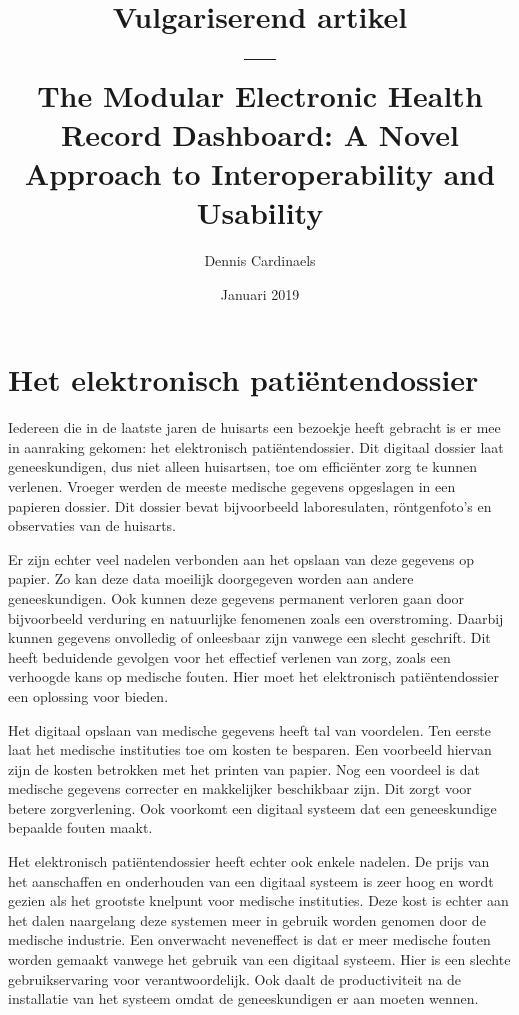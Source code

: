 \documentclass{article}
\title{Vulgariserend artikel\\---\\The Modular Electronic Health Record Dashboard: A Novel Approach to Interoperability and Usability}
\date{Januari 2019}
\author{Dennis Cardinaels}
\begin{document}
\maketitle

\section{Het elektronisch pati\"{e}ntendossier} 

Iedereen die in de laatste jaren de huisarts een bezoekje heeft gebracht is er mee in aanraking gekomen: het elektronisch pati\"{e}ntendossier. Dit digitaal dossier laat geneeskundigen, dus niet alleen huisartsen, toe om effici\"{e}nter zorg te kunnen verlenen. Vroeger werden de meeste medische gegevens opgeslagen in een papieren dossier. Dit dossier bevat bijvoorbeeld laboresulaten, r\"{o}ntgenfoto's en observaties van de huisarts.

Er zijn echter veel nadelen verbonden aan het opslaan van deze gegevens op papier. Zo kan deze data moeilijk doorgegeven worden aan andere geneeskundigen. Ook kunnen deze gegevens permanent verloren gaan door bijvoorbeeld verduring en natuurlijke fenomenen zoals een overstroming. Daarbij kunnen gegevens onvolledig of onleesbaar zijn vanwege een slecht geschrift. Dit heeft beduidende gevolgen voor het effectief verlenen van zorg, zoals een verhoogde kans op medische fouten. Hier moet het elektronisch pati\"{e}ntendossier een oplossing voor bieden.

Het digitaal opslaan van medische gegevens heeft tal van voordelen. Ten eerste laat het medische instituties toe om kosten te besparen. Een voorbeeld hiervan zijn de kosten betrokken met het printen van papier. Nog een voordeel is dat medische gegevens correcter en makkelijker beschikbaar zijn. Dit zorgt voor betere zorgverlening. Ook voorkomt een digitaal systeem dat een geneeskundige bepaalde fouten maakt.

Het elektronisch pati\"{e}ntendossier heeft echter ook enkele nadelen. De prijs van het aanschaffen en onderhouden van een digitaal systeem is zeer hoog en wordt gezien als het grootste knelpunt voor medische instituties. Deze kost is echter aan het dalen naargelang deze systemen meer in gebruik worden genomen door de medische industrie. Een onverwacht neveneffect is dat er meer medische fouten worden gemaakt vanwege het gebruik van een digitaal systeem. Hier is een slechte gebruikservaring voor verantwoordelijk. Ook daalt de productiviteit na de installatie van het systeem omdat de geneeskundigen er aan moeten wennen.
\end{document}
